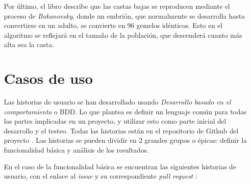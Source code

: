 Por último, el libro describe que las castas bajas se reproducen mediante el proceso de \textit{Bokanovsky}, donde un embrión, que normalmente se desarrolla hasta convertirse
en un adulto, se convierte en 96 gemelos idénticos. Esto en el algoritmo se reflejará en el tamaño de la población, que descenderá cuanto más alta sea la casta.

\section{Casos de uso}

Las historias de usuario se han desarrollado usando \emph{Desarrollo basado en el comportamiento} o BDD. Lo que plantea es definir un lenguaje común para todas las
partes implicadas en un proyecto, y utilizar esto como parte inicial del desarrollo y el testeo. Todas las historias están en el repositorio de Github del proyecto \cite{project_repository}.
Las historias se pueden dividir en 2 grandes grupos o épicas: definir la funcionalidad básica y análisis de los resultados.

En el caso de la funcionalidad básica se encuentran las siguientes historias de usuario, con el enlace al \emph{issue} y su correspondiente \emph{pull request} :

